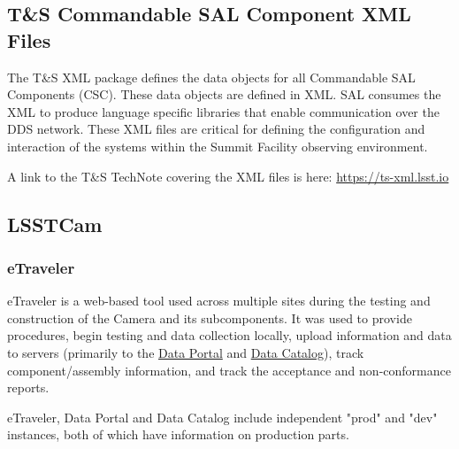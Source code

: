 \subsection{T\&S Commandable SAL Component XML Files}

The T\&S XML package defines the data objects for all Commandable SAL Components (CSC). These data objects are defined in XML. SAL consumes the XML to produce language specific libraries that enable communication over the DDS network.  These XML files are critical for defining the configuration and interaction of the systems within the Summit Facility observing environment.

A link to the T\&S TechNote covering the XML files is here: \url{https://ts-xml.lsst.io}

\subsection{LSSTCam}
	\subsubsection{eTraveler}
	eTraveler is a web-based tool used across multiple sites during the testing and construction of the Camera and its subcomponents. It was used to provide procedures, begin testing and data collection locally, upload information and data to servers (primarily to the \href{http://lsst-camera.slac.stanford.edu/DataPortal/}{Data Portal} and \href{http://srs.slac.stanford.edu/DataCatalog/?experiment=LSST-CAMERA}{Data Catalog}), track component/assembly information, and track the acceptance and non-conformance reports.

	eTraveler, Data Portal and Data Catalog include independent "prod" and "dev" instances, both of which have information on production parts.


